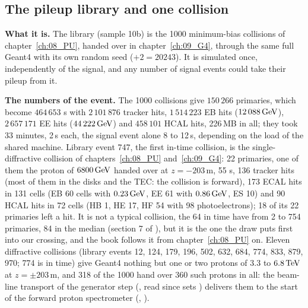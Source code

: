 \subsection{The pileup library and one collision}
\label{sec:10_library}

\textbf{What it is.} The library (sample 10b) is the 1000 minimum-bias collisions of chapter~\ref{ch:08_PU}, handed
over in chapter~\ref{ch:09_G4}, through the same full Geant4 with its own random seed ($+2 = 20243$). It
is simulated once, independently of the signal, and any number of signal events could take their pileup from it.

\textbf{The numbers of the event.} The 1000 collisions give $150\,266$ primaries, which become $464\,653$
s with $2\,101\,876$ tracker hits, $1\,514\,223$ EB hits ($12\,088\,\mathrm{GeV}$), $2\,657\,171$ EE hits
($44\,222\,\mathrm{GeV}$) and $458\,101$ HCAL hits, 226\,MB in all; they took 33 minutes, 2\,s each, the signal event alone 8
to 12\,s, depending on the load of the shared machine. Library event 747, the first in-time collision, is the
single-diffractive collision of chapters~\ref{ch:08_PU} and~\ref{ch:09_G4}: 22 primaries, one of them the proton of
$6800\,\mathrm{GeV}$ handed over at $z=-203$\,m, 55 s, 136 tracker hits (most of them in the disks and the
TEC: the collision is forward), 173 ECAL hits in 131 cells (EB 60 cells with $0.23\,\mathrm{GeV}$, EE 61 with $0.86\,\mathrm{GeV}$, ES 10)
and 90 HCAL hits in 72 cells (HB 1, HE 17, HF 54 with 98 photoelectrons); 18 of its 22 primaries left a hit. It is not a typical collision, the 64 in time have from 2 to 754 primaries, 84 in the
median (section 7 of ), but it is the one the draw puts first into our crossing, and the
book follows it from chapter~\ref{ch:08_PU} on. Eleven diffractive collisions (library events 12, 124, 179, 196, 502,
632, 684, 774, 833, 879, 970; 774 is in time) give Geant4 nothing but one or two protons of $3.3$ to $6.8\,\mathrm{TeV}$ at
$z=\pm203$\,m, and 318 of the 1000 hand over 360 such protons in all: the beam-line transport of the generator step
(, read since  sets ) delivers them to the
start of the forward proton spectrometer (,
).

